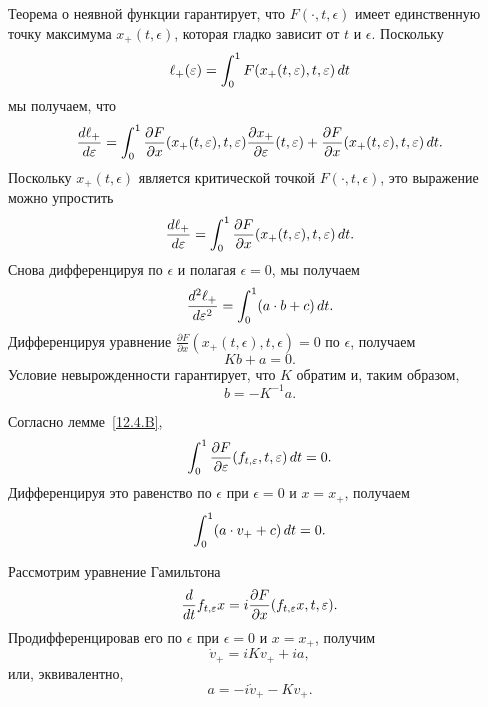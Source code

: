 Теорема о неявной функции гарантирует, что $F(\cdot, t, \epsilon)$ имеет единственную точку максимума $x_+(t, \epsilon)$, которая гладко зависит от $t$ и $\epsilon$.
Поскольку 
\[\ell_+(\varepsilon)=\int_0^1F(x_+(t,\varepsilon),t,\varepsilon)\,d t\]
мы получаем, что
\[\frac{d \ell_+}{d \varepsilon}
=
\int_0^1
\frac{\partial F}{\partial x}(x_+(t,\varepsilon),t,\varepsilon)\frac{\partial x_+}{\partial \varepsilon}(t,\varepsilon)
+
\frac{\partial F}{\partial x}(x_+(t,\varepsilon),t,\varepsilon)\,d t.
\]
Поскольку $x_+(t,\epsilon)$ является критической точкой $F(\cdot,t,\epsilon)$, это выражение можно упростить
\[\frac{d \ell_+}{d \varepsilon}
=
\int_0^1
\frac{\partial F}{\partial x}(x_+(t,\varepsilon),t,\varepsilon)\,d t.
\]
Снова дифференцируя по $\epsilon$ и полагая $\epsilon = 0$, мы получаем 
\begin{equation}
\frac{d^2 \ell_+}{d\varepsilon^2}=\int_0^1 (a\cdot b +c)\,d t.
\label{eq:12.4.C}
\end{equation}
Дифференцируя уравнение 
$\frac{\partial F}{\partial x}(x_+ (t, \epsilon), t, \epsilon) = 0$ по $\epsilon$, получаем
\[Kb+a = 0.\]
Условие невырожденности гарантирует, что $K$ обратим и, таким образом, 
\begin{equation}
b=-K^{-1}a.
\label{eq:12.4.D}
\end{equation}

Согласно лемме~\ref{12.4.B}, 
\[\int_0^1\frac{\partial F}{\partial \varepsilon}(f_{t,\varepsilon},t,\varepsilon)\,d t=0.\]
Дифференцируя это равенство по $\epsilon$ при $\epsilon = 0$ и $x = x_+$, получаем 
\begin{equation}
\int_0^1(a\cdot v_++c)\,d t = 0.
\label{eq:12.4.E}
\end{equation}

Рассмотрим уравнение Гамильтона
\[\frac{d}{d t}f_{t,\varepsilon}x=i\frac{\partial F}{\partial x}(f_{t,\varepsilon}x,t,\varepsilon).\]
Продифференцировав его по $\epsilon$ при $\epsilon = 0$ и $x = x_+$,
получим
\[\dot v_+=iKv_++ia,\]
или, эквивалентно,
\begin{equation}
a=-i\dot v_+-Kv_+.
\label{eq:12.4.F}
\end{equation}

